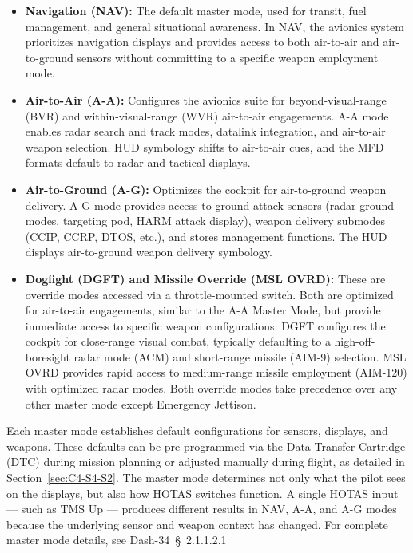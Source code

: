 \documentclass[11pt, a4paper, twoside]{report}
\providecommand{\dashref}[1]{Dash-34~\S~#1}
\begin{document}
\begin{itemize}
	\item \textbf{Navigation (NAV):} The default master mode, used for transit, fuel management, and general situational awareness. In NAV, the avionics system prioritizes navigation displays and provides access to both air-to-air and air-to-ground sensors without committing to a specific weapon employment mode.
	
	\item \textbf{Air-to-Air (A-A):} Configures the avionics suite for beyond-visual-range (BVR) and within-visual-range (WVR) air-to-air engagements. A-A mode enables radar search and track modes, datalink integration, and air-to-air weapon selection. HUD symbology shifts to air-to-air cues, and the MFD formats default to radar and tactical displays.
	
	\item \textbf{Air-to-Ground (A-G):} Optimizes the cockpit for air-to-ground weapon delivery. A-G mode provides access to ground attack sensors (radar ground modes, targeting pod, HARM attack display), weapon delivery submodes (CCIP, CCRP, DTOS, etc.), and stores management functions. The HUD displays air-to-ground weapon delivery symbology.
	
	\item \textbf{Dogfight (DGFT) and Missile Override (MSL OVRD):} These are override 	modes accessed via a throttle-mounted switch. Both are optimized for air-to-air engagements, similar to the A-A Master Mode, but provide immediate access to specific weapon configurations. DGFT configures the cockpit for close-range visual combat, typically defaulting to a high-off-boresight radar mode (ACM) and short-range missile (AIM-9) selection. MSL OVRD provides rapid access to medium-range missile employment (AIM-120) with optimized radar modes. Both override modes take precedence over any other master mode except Emergency Jettison.
\end{itemize}

Each master mode establishes default configurations for sensors, displays, and weapons. These defaults can be pre-programmed via the Data Transfer Cartridge (DTC) during mission planning or adjusted manually during flight, as detailed in Section~\ref{sec:C4-S4-S2}. The master mode determines not only what the pilot sees on the displays, but also how HOTAS switches function. A single HOTAS input — such as TMS Up — produces different results in NAV, A-A, and A-G modes because the underlying sensor and weapon context has changed. For complete master mode details, see \dashref{2.1.1.2.1}
\end{document}
